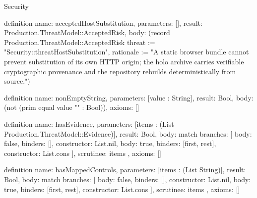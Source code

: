 \begin{lexlean}{Security}
\begin{semanticmodule}
definition{
  name: acceptedHostSubstitution,
  parameters: [],
  result: Production.ThreatModel::AcceptedRisk,
  body: (record Production.ThreatModel::AcceptedRisk {threat := "Security::threatHostSubstitution", rationale := "A static browser bundle cannot prevent substitution of its own HTTP origin; the holo archive carries verifiable cryptographic provenance and the repository rebuilds deterministically from source."})
}

definition{
  name: nonEmptyString,
  parameters: [value : String],
  result: Bool,
  body: (not (prim equal value "" : Bool)),
  axioms: []
}

definition{
  name: hasEvidence,
  parameters: [items : (List Production.ThreatModel::Evidence)],
  result: Bool,
  body: match{
    branches: [
      {body: false, binders: [], constructor: List.nil},
      {body: true, binders: [first, rest], constructor: List.cons}
    ],
    scrutinee: items
  },
  axioms: []
}

definition{
  name: hasMappedControls,
  parameters: [items : (List String)],
  result: Bool,
  body: match{
    branches: [
      {body: false, binders: [], constructor: List.nil},
      {body: true, binders: [first, rest], constructor: List.cons}
    ],
    scrutinee: items
  },
  axioms: []
}


\end{semanticmodule}
\end{lexlean}
